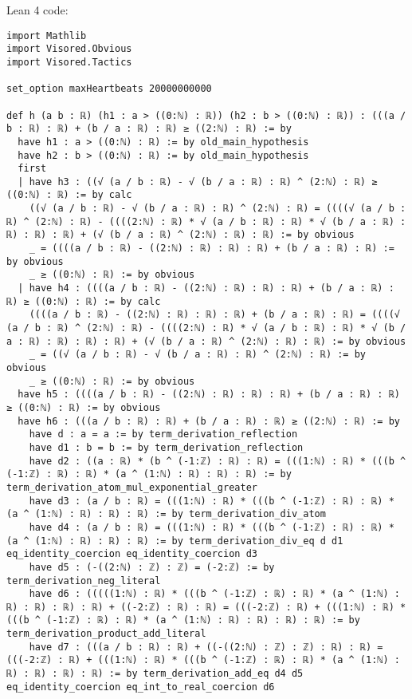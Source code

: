 \documentclass{article}
\begin{document}
Lean 4 code:
\begin{tcolorbox}[colback=white!10, width=\linewidth]
\begin{lstlisting}[language=Lean4]
import Mathlib
import Visored.Obvious
import Visored.Tactics

set_option maxHeartbeats 20000000000

def h (a b : ℝ) (h1 : a > ((0:ℕ) : ℝ)) (h2 : b > ((0:ℕ) : ℝ)) : (((a / b : ℝ) : ℝ) + (b / a : ℝ) : ℝ) ≥ ((2:ℕ) : ℝ) := by
  have h1 : a > ((0:ℕ) : ℝ) := by old_main_hypothesis
  have h2 : b > ((0:ℕ) : ℝ) := by old_main_hypothesis
  first
  | have h3 : ((√ (a / b : ℝ) - √ (b / a : ℝ) : ℝ) ^ (2:ℕ) : ℝ) ≥ ((0:ℕ) : ℝ) := by calc
    ((√ (a / b : ℝ) - √ (b / a : ℝ) : ℝ) ^ (2:ℕ) : ℝ) = ((((√ (a / b : ℝ) ^ (2:ℕ) : ℝ) - ((((2:ℕ) : ℝ) * √ (a / b : ℝ) : ℝ) * √ (b / a : ℝ) : ℝ) : ℝ) : ℝ) + (√ (b / a : ℝ) ^ (2:ℕ) : ℝ) : ℝ) := by obvious
    _ = ((((a / b : ℝ) - ((2:ℕ) : ℝ) : ℝ) : ℝ) + (b / a : ℝ) : ℝ) := by obvious
    _ ≥ ((0:ℕ) : ℝ) := by obvious
  | have h4 : ((((a / b : ℝ) - ((2:ℕ) : ℝ) : ℝ) : ℝ) + (b / a : ℝ) : ℝ) ≥ ((0:ℕ) : ℝ) := by calc
    ((((a / b : ℝ) - ((2:ℕ) : ℝ) : ℝ) : ℝ) + (b / a : ℝ) : ℝ) = ((((√ (a / b : ℝ) ^ (2:ℕ) : ℝ) - ((((2:ℕ) : ℝ) * √ (a / b : ℝ) : ℝ) * √ (b / a : ℝ) : ℝ) : ℝ) : ℝ) + (√ (b / a : ℝ) ^ (2:ℕ) : ℝ) : ℝ) := by obvious
    _ = ((√ (a / b : ℝ) - √ (b / a : ℝ) : ℝ) ^ (2:ℕ) : ℝ) := by obvious
    _ ≥ ((0:ℕ) : ℝ) := by obvious
  have h5 : ((((a / b : ℝ) - ((2:ℕ) : ℝ) : ℝ) : ℝ) + (b / a : ℝ) : ℝ) ≥ ((0:ℕ) : ℝ) := by obvious
  have h6 : (((a / b : ℝ) : ℝ) + (b / a : ℝ) : ℝ) ≥ ((2:ℕ) : ℝ) := by
    have d : a = a := by term_derivation_reflection
    have d1 : b = b := by term_derivation_reflection
    have d2 : ((a : ℝ) * (b ^ (-1:ℤ) : ℝ) : ℝ) = (((1:ℕ) : ℝ) * (((b ^ (-1:ℤ) : ℝ) : ℝ) * (a ^ (1:ℕ) : ℝ) : ℝ) : ℝ) := by term_derivation_atom_mul_exponential_greater
    have d3 : (a / b : ℝ) = (((1:ℕ) : ℝ) * (((b ^ (-1:ℤ) : ℝ) : ℝ) * (a ^ (1:ℕ) : ℝ) : ℝ) : ℝ) := by term_derivation_div_atom
    have d4 : (a / b : ℝ) = (((1:ℕ) : ℝ) * (((b ^ (-1:ℤ) : ℝ) : ℝ) * (a ^ (1:ℕ) : ℝ) : ℝ) : ℝ) := by term_derivation_div_eq d d1 eq_identity_coercion eq_identity_coercion d3
    have d5 : (-((2:ℕ) : ℤ) : ℤ) = (-2:ℤ) := by term_derivation_neg_literal
    have d6 : (((((1:ℕ) : ℝ) * (((b ^ (-1:ℤ) : ℝ) : ℝ) * (a ^ (1:ℕ) : ℝ) : ℝ) : ℝ) : ℝ) + ((-2:ℤ) : ℝ) : ℝ) = (((-2:ℤ) : ℝ) + (((1:ℕ) : ℝ) * (((b ^ (-1:ℤ) : ℝ) : ℝ) * (a ^ (1:ℕ) : ℝ) : ℝ) : ℝ) : ℝ) := by term_derivation_product_add_literal
    have d7 : (((a / b : ℝ) : ℝ) + ((-((2:ℕ) : ℤ) : ℤ) : ℝ) : ℝ) = (((-2:ℤ) : ℝ) + (((1:ℕ) : ℝ) * (((b ^ (-1:ℤ) : ℝ) : ℝ) * (a ^ (1:ℕ) : ℝ) : ℝ) : ℝ) : ℝ) := by term_derivation_add_eq d4 d5 eq_identity_coercion eq_int_to_real_coercion d6

\end{lstlisting}
\end{tcolorbox}
\end{document}
